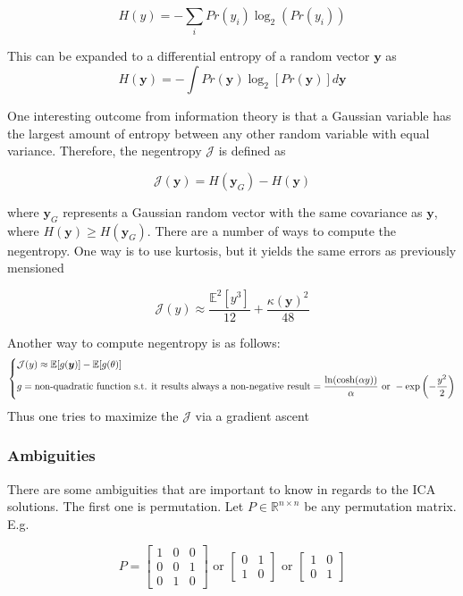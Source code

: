 $$H(y) = -\sum_i Pr(y_i) \log_2(Pr(y_i))$$

This can be expanded to a differential entropy of a random vector $\bm{y}$ as
$$H(\bm{y}) = - \int Pr(\bm{y}) \log_2 [Pr(\bm{y})] d\bm{y}$$

One interesting outcome from information theory is that a Gaussian variable has the largest amount of entropy between any other random variable with equal variance. Therefore, the negentropy $\mathcal{J}$ is defined as

$$\mathcal{J} (\bm{y}) = H(\bm{y}_G) - H(\bm{y})$$

where $\bm{y}_G$ represents a Gaussian random vector with the same covariance as $\bm{y}$, where $H(\bm{y}) \geq H(\bm{y}_G)$. There are a number of ways to compute the negentropy. One way is to use kurtosis, but it yields the same errors as previously mensioned

$$\mathcal{J}(y) \approx \frac{\mathbb{E}^2[y^3]}{12} + \frac{\kappa(\bm{y})^2}{48}$$

Another way to compute negentropy is as follows:
\begin{equation*}
\begin{dcases}
    \mathcal{J}(y) \approx \mathbb{E}[g(\bm{y})] - \mathbb{E}[g(\theta)] \\
    g = \text{non-quadratic function s.t. it results always a non-negative result} = \frac{\ln(\cosh(\alpha y))}{\alpha} \text{ or } -\exp\left( - \frac{y^2}{2}\right)
\end{dcases}
\end{equation*}
Thus one tries to maximize the $\mathcal{J}$ via a gradient ascent

\subsubsection{Ambiguities}
There are some ambiguities that are important to know in regards to the ICA solutions. The first one is permutation. Let $P \in \mathbb{R}^{n\times n}$ be any permutation matrix. E.g.

\begin{equation*}
    P = \begin{bmatrix} 1 & 0 & 0 \\ 0 & 0 & 1 \\ 0 & 1 & 0 \end{bmatrix} \text{ or } \begin{bmatrix}0 & 1 \\ 1 & 0 \end{bmatrix} \text{ or } \begin{bmatrix} 1 & 0 \\ 0 & 1 \end{bmatrix}
\end{equation*}

